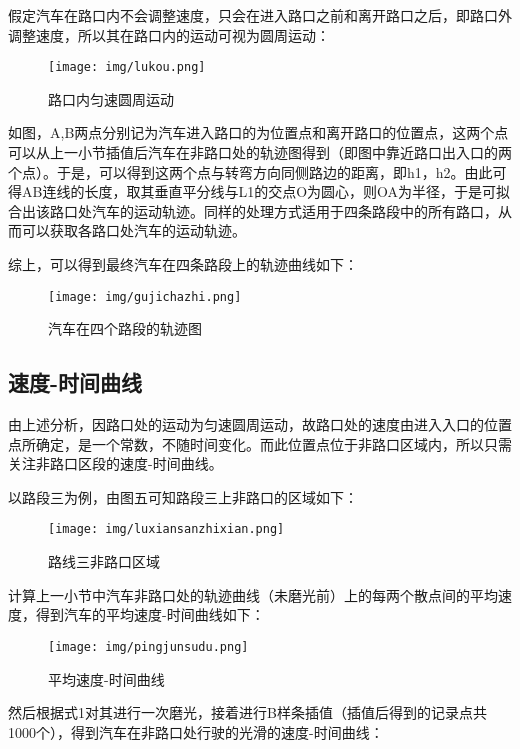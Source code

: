 \documentclass[withoutpreface,bwprint]{cumcmthesis} %
\begin{document}
假定汽车在路口内不会调整速度，只会在进入路口之前和离开路口之后，即路口外调整速度，所以其在路口内的运动可视为圆周运动：

\begin{figure}[htbp]
    \centering
    \texttt{[image: img/lukou.png]}
     \captionsetup{font=small, position=below}
    \caption{路口内匀速圆周运动}
\end{figure}

如图，A,B两点分别记为汽车进入路口的为位置点和离开路口的位置点，这两个点可以从上一小节插值后汽车在非路口处的轨迹图得到（即图中靠近路口出入口的两个点）。于是，可以得到这两个点与转弯方向同侧路边的距离，即h1，h2。由此可得AB连线的长度，取其垂直平分线与L1的交点O为圆心，则OA为半径，于是可拟合出该路口处汽车的运动轨迹。同样的处理方式适用于四条路段中的所有路口，从而可以获取各路口处汽车的运动轨迹。

综上，可以得到最终汽车在四条路段上的轨迹曲线如下：
\newepage 
\begin{figure}[htbp]
    \centering
    \texttt{[image: img/gujichazhi.png]}
     \captionsetup{font=small, position=below}
    \caption{汽车在四个路段的轨迹图}
\end{figure}



\subsection{速度-时间曲线}
由上述分析，因路口处的运动为匀速圆周运动，故路口处的速度由进入入口的位置点所确定，是一个常数，不随时间变化。而此位置点位于非路口区域内，所以只需关注非路口区段的速度-时间曲线。

以路段三为例，由图五可知路段三上非路口的区域如下：

\begin{figure}[htbp]
    \centering
    \texttt{[image: img/luxiansanzhixian.png]}
     \captionsetup{font=small, position=below}
    \caption{路线三非路口区域}
\end{figure}
计算上一小节中汽车非路口处的轨迹曲线（未磨光前）上的每两个散点间的平均速度，得到汽车的平均速度-时间曲线如下：

\begin{figure}[htbp]
    \centering
    \texttt{[image: img/pingjunsudu.png]}
     \captionsetup{font=small, position=below}
    \caption{平均速度-时间曲线}
\end{figure}



然后根据式1对其进行一次磨光，接着进行B样条插值（插值后得到的记录点共1000个），得到汽车在非路口处行驶的光滑的速度-时间曲线：
\end{document}

